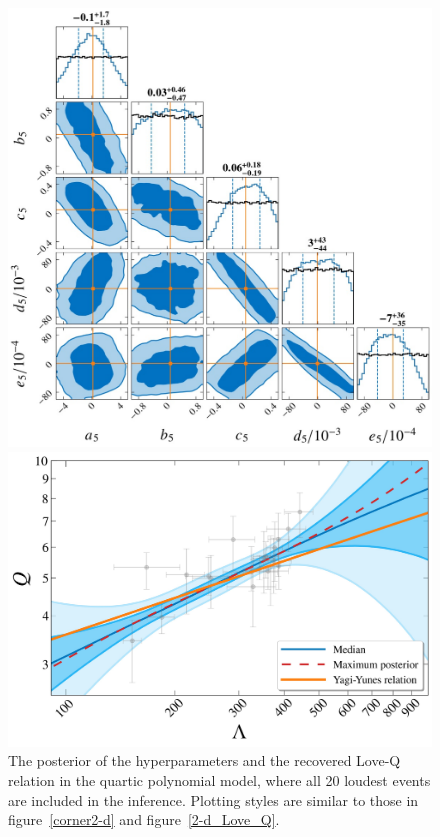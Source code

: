 \documentclass[a4paper,11pt]{article}
\begin{document}
\begin{figure}
\begin{minipage}[t]{0.49\textwidth}
\centering
\includegraphics[width=0.8\linewidth]{Hyper_parameter_5d.pdf}%
\end{minipage}
\hfill
\begin{minipage}[t]{0.49\textwidth}
\includegraphics[width=\linewidth]{hierarchical_results_APR4_5d.pdf}
\end{minipage}
    \caption{The posterior of the hyperparameters and the recovered Love-Q relation
    in the quartic polynomial model, where all 20 loudest events are included in
    the inference. Plotting styles are similar to those in figure~\ref{corner2-d} and
    figure~\ref{2-d_Love_Q}.
    } \label{5-d_Love_Q} 
\end{figure}
\end{document}
